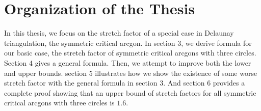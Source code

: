 \section{Organization of the Thesis}
In this thesis, we focus on the stretch factor of a special case in Delaunay triangulation, the symmetric critical arcgon. In section 3, we derive formula for our basic case, the stretch factor of symmetric critical arcgons with three circles. Section 4 gives a general formula. Then, we attempt to improve both the lower and upper bounds. section 5 illustrates how we show the existence of some worse stretch factor with the general formula in section 3. And section 6 provides a complete proof showing that an upper bound of stretch factors for all symmetric critical arcgons with  three circles is $1.6$. 